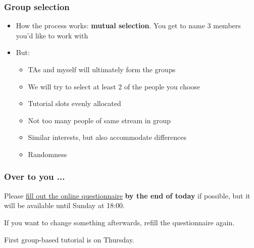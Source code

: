 \begin{frame}\frametitle{Group selection}
	\begin{itemize}
		\item	How the process works: \textbf{mutual selection}. You get to name 3 members you'd like to work with
		\item	But:
		\begin{itemize}
			\item	TAs and myself will ultimately form the groups
			\item	We will try to select at least 2 of the people you choose
			\item	Tutorial slots evenly allocated
			\item	Not too many people of same stream in group
			\item	Similar interests, but also accommodate differences
			\item	Randomness
		\end{itemize}
	\end{itemize}
\end{frame}

\begin{frame}\frametitle{Over to you ...}
	Please \href{https://docs.google.com/spreadsheet/viewform?formkey=dERqREtHZUxVMkRuT2s4bnlzeTdXY2c6MA}{fill out the online questionnaire} \textbf{by the end of today} if possible, but it will be available until Sunday at 18:00.

	\vspace{12pt}
	If you want to change something afterwards, refill the questionnaire again.

	\vspace{12pt}
	First group-based tutorial is on Thursday.
\end{frame}
